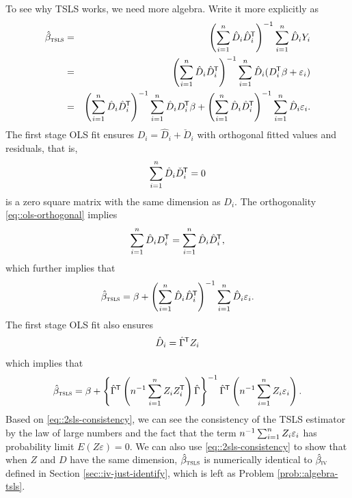 To see why TSLS works, we need more algebra. Write it more explicitly as
\begin{eqnarray} 
\hat{\beta}_\textsc{tsls} &=& \left(  \sumn \hat{D}_i\hat{D}_i\tran \right) ^{-1} 
\sumn \hat{D}_i Y_i  \label{eq::2sls-definition} \\
&=& \left(  \sumn \hat{D}_i\hat{D}_i\tran \right) ^{-1} 
\sumn \hat{D}_i (D_i \tran \beta + \varepsilon_i)  \nonumber  \\
&=& \left(  \sumn \hat{D}_i\hat{D}_i\tran \right) ^{-1} 
\sumn \hat{D}_i D_i \tran \beta + \left(  \sumn \hat{D}_i\hat{D}_i\tran \right) ^{-1} \sumn \hat{D}_i  \varepsilon_i .   \nonumber 
\end{eqnarray}  
The first stage OLS fit ensures $D_i  = \hat{D}_i + \check D_i$ with orthogonal fitted values and residuals, that is,
\begin{equation} \label{eq::ols-orthogonal}
\sumn \hat{D}_i  \check D_i\tran = 0
\end{equation}
is a zero square matrix with the same dimension as $D_i$. The orthogonality \eqref{eq::ols-orthogonal} implies 
$$
\sum_{i=1}^n \hat{D}_i D_i ^{\mkern-1.5mu\mathsf{T}} = \sum_{i=1}^n \hat{D}_i\hat{D}_i^{\mkern-1.5mu\mathsf{T}},
$$ 
which further implies that 
\begin{eqnarray}
\label{eq::2sls-ols}
\hat{\beta}_\textsc{tsls} = \beta + \left(  \sumn \hat{D}_i\hat{D}_i\tran \right) ^{-1} \sumn \hat{D}_i  \varepsilon_i.
\end{eqnarray}
The first stage OLS fit also ensures 
\begin{equation}
\label{eq::ols-donz}
\hat{D}_i = \hat{\Gamma}\tran  Z_i 
\end{equation}
which implies that
\begin{eqnarray}
\label{eq::2sls-consistency}
\hat{\beta}_\textsc{tsls} = \beta + \left\{  \hat{\Gamma}\tran  \left(  n^{-1}  \sumn Z_i Z_i\tran  \right) \hat{\Gamma}  \right\}  ^{-1}  
\hat{\Gamma}\tran  \left( n^{-1} \sumn Z_i  \varepsilon_i \right) . 
\end{eqnarray}
Based on \eqref{eq::2sls-consistency}, we can see the consistency of the TSLS estimator by the law of large numbers and the fact that the term $n^{-1} \sum_{i=1}^n Z_i  \varepsilon_i $ has probability limit $E(Z\varepsilon) = 0$. We can also use \eqref{eq::2sls-consistency} to show that when $Z$ and $D$ have the same dimension,  $\hat{\beta}_\textsc{tsls} $ is numerically identical to $\hat{\beta}_\textsc{iv} $ defined in Section \ref{sec::iv-just-identify}, which is left  as Problem \ref{prob::algebra-tsls}. 




